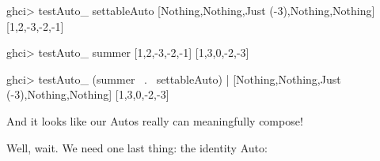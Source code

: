 \documentclass[]{article}
\newenvironment{Shaded}{}{}
\newcommand{\DataTypeTok}[1]{\textcolor[rgb]{0.56,0.13,0.00}{{#1}}}
\newcommand{\DecValTok}[1]{\textcolor[rgb]{0.25,0.63,0.44}{{#1}}}
\newcommand{\CommentTok}[1]{\textcolor[rgb]{0.38,0.63,0.69}{\textit{{#1}}}}
\newcommand{\OtherTok}[1]{\textcolor[rgb]{0.00,0.44,0.13}{{#1}}}
\newcommand{\FunctionTok}[1]{\textcolor[rgb]{0.02,0.16,0.49}{{#1}}}
\newcommand{\NormalTok}[1]{{#1}}
\begin{document}
\begin{Shaded}
\begin{Highlighting}[]
\NormalTok{ghci}\FunctionTok{>} \NormalTok{testAuto_ settableAuto [}\DataTypeTok{Nothing}\NormalTok{,}\DataTypeTok{Nothing}\NormalTok{,}\DataTypeTok{Just} \NormalTok{(}\FunctionTok{-}\DecValTok{3}\NormalTok{),}\DataTypeTok{Nothing}\NormalTok{,}\DataTypeTok{Nothing}\NormalTok{]}
\NormalTok{[}\DecValTok{1}\NormalTok{,}\DecValTok{2}\NormalTok{,}\FunctionTok{-}\DecValTok{3}\NormalTok{,}\FunctionTok{-}\DecValTok{2}\NormalTok{,}\FunctionTok{-}\DecValTok{1}\NormalTok{]}

\NormalTok{ghci}\FunctionTok{>} \NormalTok{testAuto_ summer [}\DecValTok{1}\NormalTok{,}\DecValTok{2}\NormalTok{,}\FunctionTok{-}\DecValTok{3}\NormalTok{,}\FunctionTok{-}\DecValTok{2}\NormalTok{,}\FunctionTok{-}\DecValTok{1}\NormalTok{]}
\NormalTok{[}\DecValTok{1}\NormalTok{,}\DecValTok{3}\NormalTok{,}\DecValTok{0}\NormalTok{,}\FunctionTok{-}\DecValTok{2}\NormalTok{,}\FunctionTok{-}\DecValTok{3}\NormalTok{]}

\NormalTok{ghci}\FunctionTok{>} \NormalTok{testAuto_ (summer }\FunctionTok{~.~} \NormalTok{settableAuto)}
    \FunctionTok{|}     \NormalTok{[}\DataTypeTok{Nothing}\NormalTok{,}\DataTypeTok{Nothing}\NormalTok{,}\DataTypeTok{Just} \NormalTok{(}\FunctionTok{-}\DecValTok{3}\NormalTok{),}\DataTypeTok{Nothing}\NormalTok{,}\DataTypeTok{Nothing}\NormalTok{]}
\NormalTok{[}\DecValTok{1}\NormalTok{,}\DecValTok{3}\NormalTok{,}\DecValTok{0}\NormalTok{,}\FunctionTok{-}\DecValTok{2}\NormalTok{,}\FunctionTok{-}\DecValTok{3}\NormalTok{]}
\end{Highlighting}
\end{Shaded}

And it looks like our Autos really can meaningfully compose!

Well, wait. We need one last thing: the identity Auto:

\begin{Shaded}
\end{Shaded}
\end{document}
